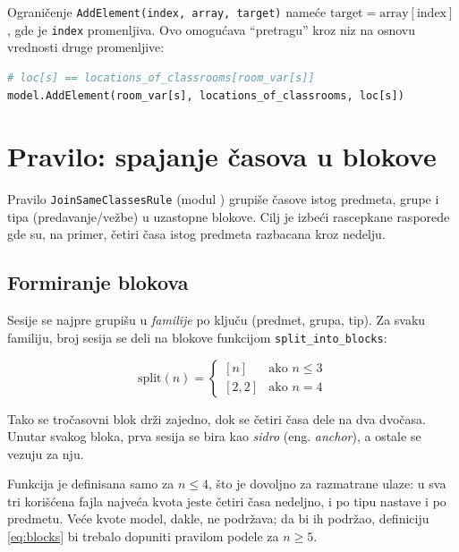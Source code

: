 \documentclass[12pt,oneside]{memoir}
\begin{document}
Ograničenje \texttt{AddElement(index, array, target)} nameće
$\text{target} = \text{array}[\text{index}]$, gde je \texttt{index}
promenljiva. Ovo omogućava ``pretragu'' kroz niz na osnovu vrednosti
druge promenljive:

\begin{english}
\begin{lstlisting}[language=Python, caption={Indeksiranje niza promenljivom}]
# loc[s] == locations_of_classrooms[room_var[s]]
model.AddElement(room_var[s], locations_of_classrooms, loc[s])
\end{lstlisting}
\end{english}

\section{Pravilo: spajanje časova u blokove}
\label{sec:rule_join}

Pravilo \texttt{JoinSameClassesRule} (modul
) grupiše časove istog predmeta,
grupe i tipa (predavanje/vežbe) u uzastopne blokove. Cilj je izbeći
rascepkane rasporede gde su, na primer, četiri časa istog predmeta
razbacana kroz nedelju.

\subsection{Formiranje blokova}

Sesije se najpre grupišu u \emph{familije} po ključu
(predmet, grupa, tip). Za svaku familiju, broj sesija se deli na blokove
funkcijom \texttt{split\_into\_blocks}:

\begin{equation}
\text{split}(n) =
\begin{cases}
[n] & \text{ako } n \leq 3 \\
[2, 2] & \text{ako } n = 4
\end{cases}
\label{eq:blocks}
\end{equation}

Tako se tročasovni blok drži zajedno, dok se četiri časa dele na dva
dvočasa. Unutar svakog bloka, prva sesija se bira kao \emph{sidro}
(eng. \emph{anchor}), a ostale se vezuju za nju.

Funkcija je definisana samo za $n \leq 4$, što je dovoljno za razmatrane
ulaze: u sva tri korišćena fajla najveća kvota jeste četiri časa
nedeljno, i po tipu nastave i po predmetu. Veće kvote model, dakle, ne
podržava; da bi ih podržao, definiciju \eqref{eq:blocks} bi trebalo
dopuniti pravilom podele za $n \geq 5$.
\end{document}
